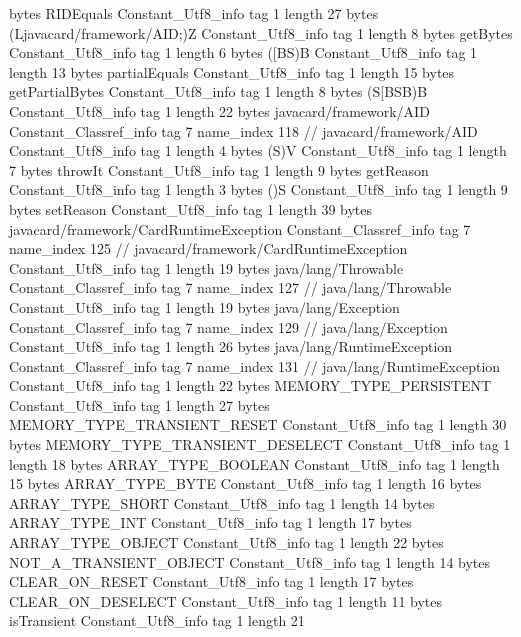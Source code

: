 {{{			bytes	RIDEquals
		}
		Constant_Utf8_info {
			tag	1
			length	27
			bytes	(Ljavacard/framework/AID;)Z
		}
		Constant_Utf8_info {
			tag	1
			length	8
			bytes	getBytes
		}
		Constant_Utf8_info {
			tag	1
			length	6
			bytes	([BS)B
		}
		Constant_Utf8_info {
			tag	1
			length	13
			bytes	partialEquals
		}
		Constant_Utf8_info {
			tag	1
			length	15
			bytes	getPartialBytes
		}
		Constant_Utf8_info {
			tag	1
			length	8
			bytes	(S[BSB)B
		}
		Constant_Utf8_info {
			tag	1
			length	22
			bytes	javacard/framework/AID
		}
		Constant_Classref_info {
			tag	7
			name_index	118		// javacard/framework/AID
		}
		Constant_Utf8_info {
			tag	1
			length	4
			bytes	(S)V
		}
		Constant_Utf8_info {
			tag	1
			length	7
			bytes	throwIt
		}
		Constant_Utf8_info {
			tag	1
			length	9
			bytes	getReason
		}
		Constant_Utf8_info {
			tag	1
			length	3
			bytes	()S
		}
		Constant_Utf8_info {
			tag	1
			length	9
			bytes	setReason
		}
		Constant_Utf8_info {
			tag	1
			length	39
			bytes	javacard/framework/CardRuntimeException
		}
		Constant_Classref_info {
			tag	7
			name_index	125		// javacard/framework/CardRuntimeException
		}
		Constant_Utf8_info {
			tag	1
			length	19
			bytes	java/lang/Throwable
		}
		Constant_Classref_info {
			tag	7
			name_index	127		// java/lang/Throwable
		}
		Constant_Utf8_info {
			tag	1
			length	19
			bytes	java/lang/Exception
		}
		Constant_Classref_info {
			tag	7
			name_index	129		// java/lang/Exception
		}
		Constant_Utf8_info {
			tag	1
			length	26
			bytes	java/lang/RuntimeException
		}
		Constant_Classref_info {
			tag	7
			name_index	131		// java/lang/RuntimeException
		}
		Constant_Utf8_info {
			tag	1
			length	22
			bytes	MEMORY_TYPE_PERSISTENT
		}
		Constant_Utf8_info {
			tag	1
			length	27
			bytes	MEMORY_TYPE_TRANSIENT_RESET
		}
		Constant_Utf8_info {
			tag	1
			length	30
			bytes	MEMORY_TYPE_TRANSIENT_DESELECT
		}
		Constant_Utf8_info {
			tag	1
			length	18
			bytes	ARRAY_TYPE_BOOLEAN
		}
		Constant_Utf8_info {
			tag	1
			length	15
			bytes	ARRAY_TYPE_BYTE
		}
		Constant_Utf8_info {
			tag	1
			length	16
			bytes	ARRAY_TYPE_SHORT
		}
		Constant_Utf8_info {
			tag	1
			length	14
			bytes	ARRAY_TYPE_INT
		}
		Constant_Utf8_info {
			tag	1
			length	17
			bytes	ARRAY_TYPE_OBJECT
		}
		Constant_Utf8_info {
			tag	1
			length	22
			bytes	NOT_A_TRANSIENT_OBJECT
		}
		Constant_Utf8_info {
			tag	1
			length	14
			bytes	CLEAR_ON_RESET
		}
		Constant_Utf8_info {
			tag	1
			length	17
			bytes	CLEAR_ON_DESELECT
		}
		Constant_Utf8_info {
			tag	1
			length	11
			bytes	isTransient
		}
		Constant_Utf8_info {
			tag	1
			length	21
}}}
